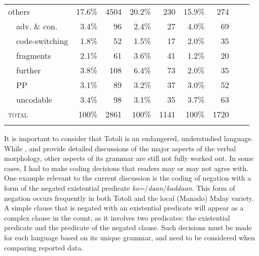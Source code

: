 \begin{table}
\begin{tabular}{l@{~~}l *8{r}}
		\midrule
		\multicolumn{2}{l}{others}        & 17.6\%       & 4504      & 20.2\%            & 230            & 15.9\%           & 274          \\
		& adv. \& con.           & 3.4\%       & 96       & 2.4\%            & 27             & 4.0\%           & 69           \\
		& code-switching         & 1.8\%       & 52       & 1.5\%            & 17             & 2.0\%           & 35           \\
		& fragments              & 2.1\%        & 61       & 3.6\%            & 41             & 1.2\%            & 20           \\
		& further                  & 3.8\%        & 108       & 6.4\%             & 73              & 2.0\%            & 35           \\
		& PP                     & 3.1\%       & 89       & 3.2\%            & 37             & 3.0\%           & 52           \\
		& uncodable             & 3.4\%       & 98       & 3.1\%            & 35             & 3.7\%           & 63          \\
		\midrule
		\multicolumn{2}{l}{\textsc{total}}        & 100\%       & 2861      & 100\%            & 1141            & 100\%           & 1720          \\
		\lspbottomrule
	\end{tabular}
\end{table}




It is important to consider that Totoli is an endangered, understudied language. While \citet{Riesberg_2014_Symmetrical_Voice},  \citet{Himmelmann_2013_symm_voice} and \citet{RiesbergMalcherHimmelmann} provide detailed discussions of the major aspects of the verbal morphology, other aspects of its grammar are still not fully worked out. In some cases, I had to make coding decisions that readers may or may not agree with. One example relevant to the current discussion is the coding of negation with a form of the negated existential predicate \textit{ko=}/\textit{daan}/\textit{kaddaan}.  This form of negation occurs frequently in both Totoli and the local (Manado) Malay variety. A simple clause that is negated with an existential predicate will appear as a complex clause in the count, as it involves two predicates: the existential predicate and the predicate of the negated clause. Such decisions must be made for each language based on its unique grammar, and need to be considered when comparing reported data. 

